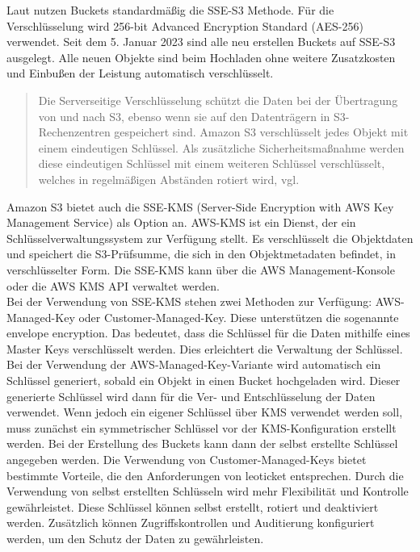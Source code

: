 Laut \citeauthor{aws-iam-s3} nutzen Buckets standardmäßig die SSE-S3 Methode. Für die Verschlüsselung wird 256-bit Advanced Encryption Standard (AES-256) verwendet. Seit dem 5. Januar 2023 sind alle neu erstellen Buckets auf SSE-S3 ausgelegt. Alle neuen Objekte sind beim Hochladen ohne weitere Zusatzkosten und Einbußen der Leistung automatisch verschlüsselt.

\begin{quote}
	Die Serverseitige Verschlüsselung schützt die Daten bei der Übertragung von und nach S3, ebenso wenn sie auf den Datenträgern in S3-Rechenzentren gespeichert sind. Amazon S3 verschlüsselt jedes Objekt mit einem eindeutigen Schlüssel. Als zusätzliche Sicherheitsmaßnahme werden diese eindeutigen Schlüssel mit einem weiteren Schlüssel verschlüsselt, welches in regelmäßigen Abständen rotiert wird, vgl. \cite{aws-iam-s3}
\end{quote}

\newpage

Amazon S3 bietet auch die SSE-KMS (Server-Side Encryption with AWS Key Management Service) als Option an. AWS-KMS ist ein Dienst, der ein Schlüsselverwaltungssystem zur Verfügung stellt. Es verschlüsselt die Objektdaten und speichert die S3-Prüfsumme, die sich in den Objektmetadaten befindet, in verschlüsselter Form. Die SSE-KMS kann über die AWS Management-Konsole oder die AWS KMS API verwaltet werden.\\

Bei der Verwendung von SSE-KMS stehen zwei Methoden zur Verfügung: AWS-Managed-Key oder Customer-Managed-Key. Diese unterstützen die sogenannte \glqq envelope encryption\grqq. Das bedeutet, dass die Schlüssel für die Daten mithilfe eines Master Keys verschlüsselt werden. Dies erleichtert die Verwaltung der Schlüssel.\\

Bei der Verwendung der AWS-Managed-Key-Variante wird automatisch ein Schlüssel generiert, sobald ein Objekt in einen Bucket hochgeladen wird. Dieser generierte Schlüssel wird dann für die Ver- und Entschlüsselung der Daten verwendet. Wenn jedoch ein eigener Schlüssel über KMS verwendet werden soll, muss zunächst ein symmetrischer Schlüssel vor der KMS-Konfiguration erstellt werden. Bei der Erstellung des Buckets kann dann der selbst erstellte Schlüssel angegeben werden. Die Verwendung von Customer-Managed-Keys bietet bestimmte Vorteile, die den Anforderungen von leoticket entsprechen. Durch die Verwendung von selbst erstellten Schlüsseln wird mehr Flexibilität und Kontrolle gewährleistet. Diese Schlüssel können selbst erstellt, rotiert und deaktiviert werden. Zusätzlich können Zugriffskontrollen und Auditierung konfiguriert werden, um den Schutz der Daten zu gewährleisten.\\

